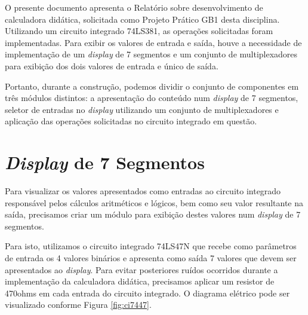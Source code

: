 \documentclass{article}
\begin{document}
O presente documento apresenta o Relatório sobre desenvolvimento de calculadora
didática, solicitada como Projeto Prático GB1 desta disciplina. Utilizando um
circuito integrado 74LS381, as operações solicitadas foram implementadas. Para
exibir os valores de entrada e saída, houve a necessidade de implementação de um
\emph{display} de 7 segmentos e um conjunto de multiplexadores para exibição dos
dois valores de entrada e único de saída.

Portanto, durante a construção, podemos dividir o conjunto de componentes em
três módulos distintos: a apresentação do conteúdo num \emph{display} de 7
segmentos, seletor de entradas no \emph{display} utilizando um conjunto de
multiplexadores e aplicação das operações solicitadas no circuito integrado em
questão.

\section{\emph{Display} de 7 Segmentos}

Para visualizar os valores apresentados como entradas ao circuito integrado
responsável pelos cálculos aritméticos e lógicos, bem como seu valor resultante
na saída, precisamos criar um módulo para exibição destes valores num
\emph{display} de 7 segmentos.

Para isto, utilizamos o circuito integrado 74LS47N que recebe como parâmetros de
entrada os 4 valores binários e apresenta como saída 7 valores que devem ser
apresentados ao \emph{display}. Para evitar posteriores ruídos ocorridos durante
a implementação da calculadora didática, precisamos aplicar um resistor de
470ohms em cada entrada do circuito integrado. O diagrama elétrico pode ser
visualizado conforme Figura \ref{fig:ci7447}.
\end{document}
